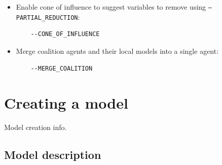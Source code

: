 \documentclass[12pt]{article}
\begin{document}
\begin{itemize}
  \begin{lstlisting}
    --RECOMMEND_REDUCTION_VARIABLES
  \end{lstlisting}
  \item Enable cone of influence to suggest variables to remove using \texttt{--PARTIAL\_REDUCTION}:
  \begin{lstlisting}
    --CONE_OF_INFLUENCE
  \end{lstlisting}
  \item Merge coalition agents and their local models into a single agent:
  \begin{lstlisting}
    --MERGE_COALITION
  \end{lstlisting}
\end{itemize}

\section{Creating a model}
Model creation info.
\subsection{Model description}
\end{document}
